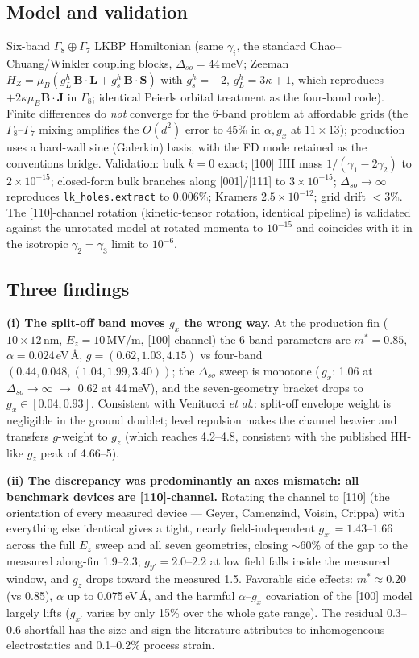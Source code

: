 \documentclass[11pt]{article}
\begin{document}
\subsection{Model and validation}
Six-band $\Gamma_8\oplus\Gamma_7$ LKBP Hamiltonian (same $\gamma_i$, the
standard Chao--Chuang/Winkler coupling blocks, $\Delta_{so} = 44$\,meV;
Zeeman $H_Z = \mu_B(g_L^h\,\mathbf{B\cdot L} + g_s^h\,\mathbf{B\cdot S})$
with $g_s^h = -2$, $g_L^h = 3\kappa + 1$, which reproduces $+2\kappa\mu_B
\mathbf{B\cdot J}$ in $\Gamma_8$; identical Peierls orbital treatment as the
four-band code). Finite differences do \emph{not} converge for the 6-band
problem at affordable grids (the $\Gamma_8$--$\Gamma_7$ mixing amplifies the
$O(d^2)$ error to 45\% in $\alpha, g_x$ at $11\times13$); production uses a
hard-wall sine (Galerkin) basis, with the FD mode retained as the
conventions bridge. Validation: bulk $k = 0$ exact; [100] HH mass
$1/(\gamma_1 - 2\gamma_2)$ to $2\times10^{-15}$; closed-form bulk branches
along [001]/[111] to $3\times10^{-15}$; $\Delta_{so}\to\infty$ reproduces
\texttt{lk\_holes.extract} to 0.006\%; Kramers $2.5\times10^{-12}$;
grid drift $<3\%$. The [110]-channel rotation (kinetic-tensor rotation,
identical pipeline) is validated against the unrotated model at rotated
momenta to $10^{-15}$ and coincides with it in the isotropic
$\gamma_2 = \gamma_3$ limit to $10^{-6}$.

\subsection{Three findings}
\textbf{(i) The split-off band moves $g_x$ the wrong way.} At the
production fin ($10\times12$\,nm, $E_z = 10$\,MV/m, [100] channel) the
6-band parameters are $m^* = 0.85$, $\alpha = 0.024$\,eV\,\AA,
$g = (0.62, 1.03, 4.15)$ vs four-band $(0.44, 0.048, (1.04, 1.99, 3.40))$;
the $\Delta_{so}$ sweep is monotone (\,$g_x$: 1.06 at $\Delta_{so}\to\infty$
$\to$ 0.62 at 44\,meV), and the seven-geometry bracket drops to
$g_x \in [0.04, 0.93]$. Consistent with Venitucci \emph{et al.}: split-off
envelope weight is negligible in the ground doublet; level repulsion makes
the channel heavier and transfers $g$-weight to $g_z$ (which reaches
4.2--4.8, consistent with the published HH-like $g_z$ peak of 4.66--5).

\textbf{(ii) The discrepancy was predominantly an axes mismatch: all
benchmark devices are [110]-channel.} Rotating the channel to [110] (the
orientation of every measured device --- Geyer, Camenzind, Voisin, Crippa)
with everything else identical gives a tight, nearly field-independent
$g_{x'} = 1.43$--$1.66$ across the full $E_z$ sweep and all seven
geometries, closing $\sim$60\% of the gap to the measured along-fin
1.9--2.3; $g_{y'} = 2.0$--$2.2$ at low field falls inside the measured
window, and $g_z$ drops toward the measured 1.5. Favorable side effects:
$m^* \approx 0.20$ (vs 0.85), $\alpha$ up to 0.075\,eV\,\AA, and the
harmful $\alpha$--$g_x$ covariation of the [100] model largely lifts
($g_{x'}$ varies by only 15\% over the whole gate range). The residual
0.3--0.6 shortfall has the size and sign the literature attributes to
inhomogeneous electrostatics and 0.1--0.2\% process strain.
\end{document}
